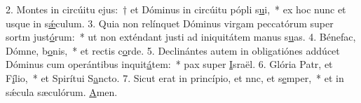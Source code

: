 2. Montes in circúitu ejus:~† et Dóminus in circúitu pópli s\uline{u}i,~* ex hoc nunc et usque in s\uline{ǽ}culum.
3. Quia non relínquet Dóminus virgam peccatórum super sortm just\uline{ó}rum:~* ut non exténdant justi ad iniquitátem manus s\uline{u}as.
4. Bénefac, Dómne, b\uline{o}nis,~* et rectis c\uline{o}rde.
5. Declinántes autem in obligatiónes addúcet Dóminus cum operántibus inquit\uline{á}tem:~* pax super \uline{I}sraël.
6. Glória Patr, et F\uline{í}lio,~* et Spirítui S\uline{a}ncto.
7. Sicut erat in princípio, et nnc, et s\uline{e}mper,~* et in sǽcula sæculórum. \uline{A}men.
